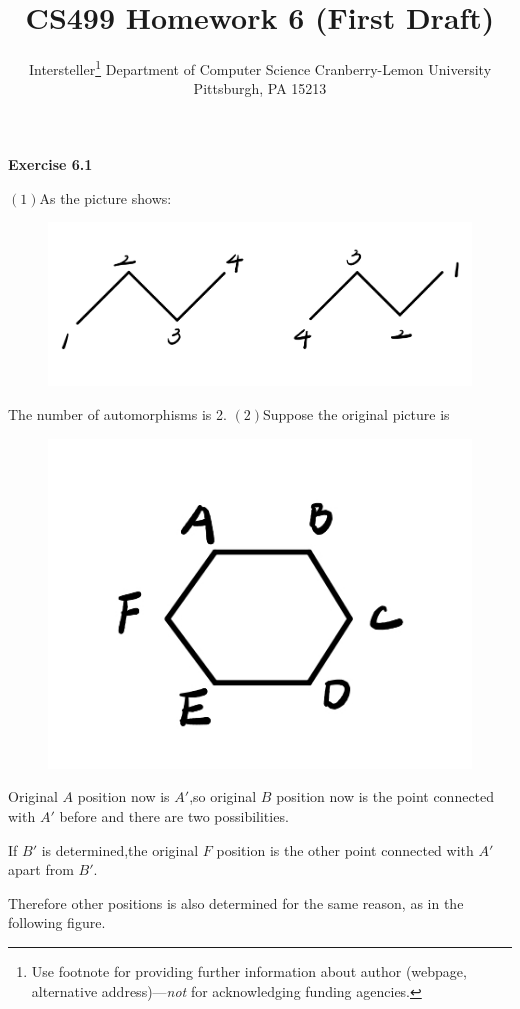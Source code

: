 \documentclass{article} %
\title{CS499 Homework 6 (First Draft)}
\author{
	Intersteller\thanks{ Use footnote for providing further information
		about author (webpage, alternative address)---\emph{not} for acknowledging
		funding agencies.}
	Department of Computer Science
	Cranberry-Lemon University
	Pittsburgh, PA 15213
}
\begin{document}
	\maketitle
	\textbf{Exercise 6.1}\par
    $(1)$As the picture shows:\par
    \begin{figure}[H]
		\centering
		\includegraphics[scale=0.3]{p31.jpg}
		\caption{}
		\label{fig:1}
	\end{figure}
	The number of automorphisms is 2.
    $(2)$Suppose the original picture is\par
    \begin{figure}[H]
		\centering
		\includegraphics[scale=0.4]{p32.jpg}
		\caption{}
		\label{fig:2}
	\end{figure}
    Original $A$ position now is $A'$,so original $B$ position now is the point connected with $A'$ before and there are two possibilities.\par
    If $B'$ is determined,the original $F$ position is the other point connected with $A'$ apart from $B'$.\par
    Therefore other positions is also determined for the same reason, as in the following figure.\par
\end{document}

